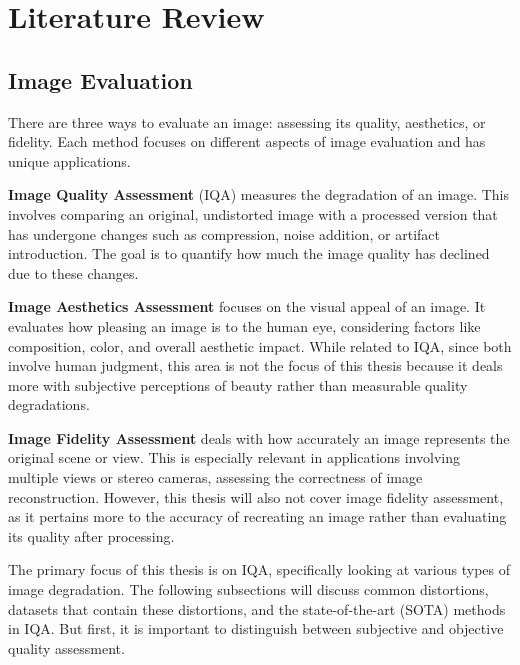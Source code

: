 \chapter{Literature Review}
\label{ch:LiteratureReview}

\section{Image Evaluation}
\label{sec:ImageEvaluation}
There are three ways to evaluate an image: assessing its quality, aesthetics, or fidelity. Each method focuses on different aspects of image evaluation and has unique applications. \par
\vspace{\baselineskip}
\noindent
\textbf{Image Quality Assessment} (IQA) measures the degradation of an image. This involves comparing an original, undistorted image with a processed version that has undergone changes such as compression, noise addition, or artifact introduction. The goal is to quantify how much the image quality has declined due to these changes.\par
\vspace{\baselineskip}
\noindent
\textbf{Image Aesthetics Assessment} focuses on the visual appeal of an image. It evaluates how pleasing an image is to the human eye, considering factors like composition, color, and overall aesthetic impact. While related to IQA, since both involve human judgment, this area is not the focus of this thesis because it deals more with subjective perceptions of beauty rather than measurable quality degradations. \par
\vspace{\baselineskip}
\noindent
\textbf{Image Fidelity Assessment} deals with how accurately an image represents the original scene or view. This is especially relevant in applications involving multiple views or stereo cameras, assessing the correctness of image reconstruction. However, this thesis will also not cover image fidelity assessment, as it pertains more to the accuracy of recreating an image rather than evaluating its quality after processing. \par
\vspace{\baselineskip}
\noindent
The primary focus of this thesis is on IQA, specifically looking at various types of image degradation. The following subsections will discuss common distortions, datasets that contain these distortions, and the state-of-the-art (SOTA) methods in IQA. But first, it is important to distinguish between subjective and objective quality assessment. \par


